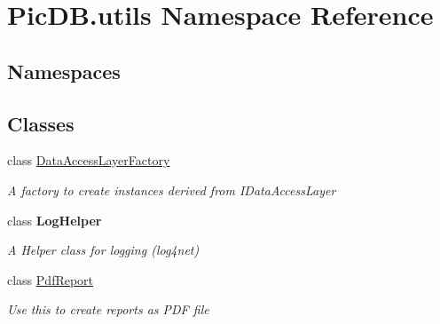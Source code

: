 \hypertarget{namespace_pic_d_b_1_1utils}{}\section{Pic\+D\+B.\+utils Namespace Reference}
\label{namespace_pic_d_b_1_1utils}
\subsection*{Namespaces}
\begin{DoxyCompactItemize}
\end{DoxyCompactItemize}
\subsection*{Classes}
\begin{DoxyCompactItemize}
\item 
class \mbox{\hyperlink{class_pic_d_b_1_1utils_1_1_data_access_layer_factory}{Data\+Access\+Layer\+Factory}}
\begin{DoxyCompactList}\small\item\em A factory to create instances derived from I\+Data\+Access\+Layer \end{DoxyCompactList}\item 
class {\bfseries Log\+Helper}
\begin{DoxyCompactList}\small\item\em A Helper class for logging (log4net) \end{DoxyCompactList}\item 
class \mbox{\hyperlink{class_pic_d_b_1_1utils_1_1_pdf_report}{Pdf\+Report}}
\begin{DoxyCompactList}\small\item\em Use this to create reports as P\+DF file \end{DoxyCompactList}\end{DoxyCompactItemize}
